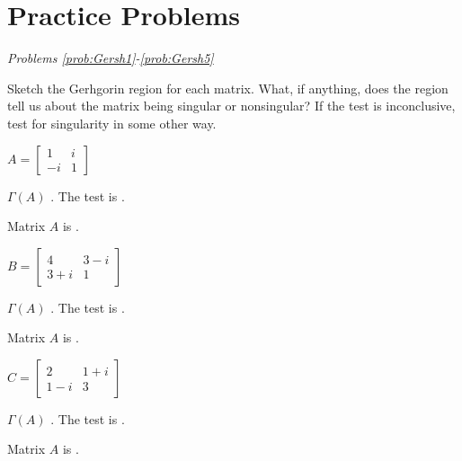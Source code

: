 \documentclass{ximera}
\begin{document}
\section*{Practice Problems}

\emph{Problems \ref{prob:Gersh1}-\ref{prob:Gersh5}}

    Sketch the Gerhgorin region for each matrix.  What, if anything, does the region tell us about the matrix being singular or nonsingular?  If the test is inconclusive, test for singularity in some other way.

\begin{problem}\label{prob:Gersh1}
$A = \left[ \begin{array}{rr}
1 & i\\
-i & 1
\end{array}\right]$

\begin{prompt}
$\Gamma (A)$ .  The test is .
\end{prompt}
\begin{problem}
Matrix $A$ is .
\end{problem}
\end{problem}

\begin{problem}\label{prob:Gersh2}
$B = \left[ \begin{array}{cc}
4 & 3 - i \\
3 + i & 1
\end{array}\right]$

\begin{prompt}
$\Gamma (A)$ .  The test is .
\end{prompt}
\begin{problem}
Matrix $A$ is .
\end{problem}
\end{problem}

\begin{problem}\label{prob:Gersh3}
$C = \left[ \begin{array}{cc}
2 & 1 + i\\
1 - i & 3
\end{array}\right]$

\begin{prompt}
$\Gamma (A)$ .  The test is .
\end{prompt}
\begin{problem}
Matrix $A$ is .
\end{problem}
\end{problem}
\end{document}
